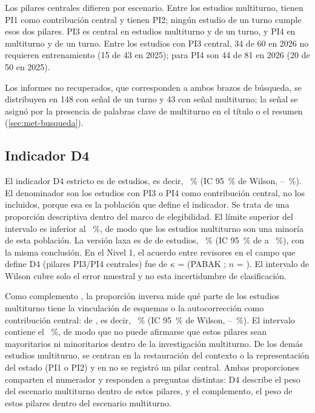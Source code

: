 Los pilares centrales difieren por escenario. Entre los estudios multiturno, \nPilarUnoMT{} tienen PI1 como contribución central y \nPilarDosMT{} tienen PI2; ningún estudio de un turno cumple esos dos pilares. PI3 es central en \nPilarTresMT{} estudios multiturno y \nPilarTresUT{} de un turno, y PI4 en \nPilarCuatroMT{} multiturno y \nPilarCuatroUT{} de un turno. Entre los estudios con PI3 central, 34 de 60 en 2026 no requieren entrenamiento (15 de 43 en 2025); para PI4 son 44 de 81 en 2026 (20 de 50 en 2025).

Los informes no recuperados, que corresponden a ambos brazos de búsqueda, se distribuyen en 148 con señal de un turno y 43 con señal multiturno; la señal se asignó por la presencia de palabras clave de multiturno en el título o el resumen (\cref{sec:met-busqueda}).

\subsection{Indicador D4}
\label{sec:res-d4}

El indicador D4 estricto es \DcuatroK{} de \DcuatroN{} estudios, es decir, \DcuatroPct~\% (IC 95~\% de Wilson, \DcuatroICinf{}--\DcuatroICsup{}~\%). El denominador son los estudios con PI3 o PI4 como contribución central, no los \nEstudios{} incluidos, porque esa es la población que define el indicador. Se trata de una proporción descriptiva dentro del marco de elegibilidad. El límite superior del intervalo es inferior al \umbralMayoria~\%, de modo que los estudios multiturno son una minoría de esta población. La versión laxa es de \DcuatroLaxoK{} de \DcuatroLaxoN{} estudios, \DcuatroLaxoPct~\% (IC 95~\% de \DcuatroLaxoICinf{} a \DcuatroLaxoICsup~\%), con la misma conclusión. En el Nivel 1, el acuerdo entre revisores en el campo que define D4 (pilares PI3/PI4 centrales) fue de $\kappa$ = \kappaCentral{} (PABAK \pabakCentral{}; $n$ = \nKappaCentral{}). El intervalo de Wilson cubre solo el error muestral y no esta incertidumbre de clasificación.

Como complemento , la proporción inversa mide qué parte de los estudios multiturno tiene la vinculación de esquemas o la autocorrección como contribución central: \DcompK{} de \DcompN{}, es decir, \DcompPct~\% (IC 95~\% de Wilson, \DcompICinf{}--\DcompICsup{}~\%). El intervalo contiene el \umbralMayoria~\%, de modo que no puede afirmarse que estos pilares sean mayoritarios ni minoritarios dentro de la investigación multiturno. De los demás estudios multiturno, \DcompRestoPIdos{} se centran en la restauración del contexto o la representación del estado (PI1 o PI2) y en \DcompRestoSinPilar{} no se registró un pilar central. Ambas proporciones comparten el numerador y responden a preguntas distintas: D4 describe el peso del escenario multiturno dentro de estos pilares, y el complemento, el peso de estos pilares dentro del escenario multiturno.

